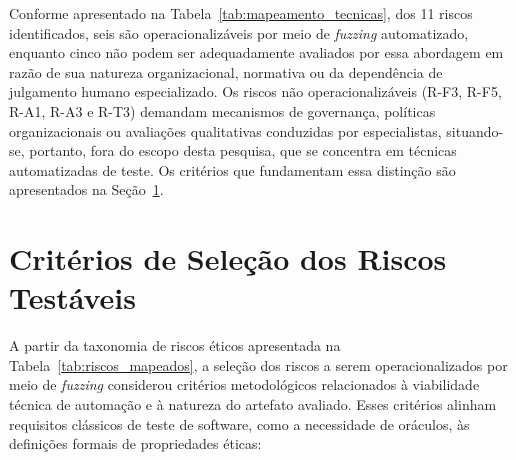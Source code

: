 Conforme apresentado na Tabela~\ref{tab:mapeamento_tecnicas}, dos 11 riscos identificados, seis são operacionalizáveis por meio de \textit{fuzzing} automatizado, enquanto cinco não podem ser adequadamente avaliados por essa abordagem em razão de sua natureza organizacional, normativa ou da dependência de julgamento humano especializado. Os riscos não operacionalizáveis (R-F3, R-F5, R-A1, R-A3 e R-T3) demandam mecanismos de governança, políticas organizacionais ou avaliações qualitativas conduzidas por especialistas, situando-se, portanto, fora do escopo desta pesquisa, que se concentra em técnicas automatizadas de teste. Os critérios que fundamentam essa distinção são apresentados na Seção~\ref{sec:criterios_selecao}.

\section{Critérios de Seleção dos Riscos Testáveis}
\label{sec:criterios_selecao}

A partir da taxonomia de riscos éticos apresentada na Tabela~\ref{tab:riscos_mapeados}, a seleção dos riscos a serem operacionalizados por meio de \textit{fuzzing} considerou critérios metodológicos relacionados à viabilidade técnica de automação e à natureza do artefato avaliado. Esses critérios alinham requisitos clássicos de teste de software, como a necessidade de oráculos, às definições formais de propriedades éticas:

